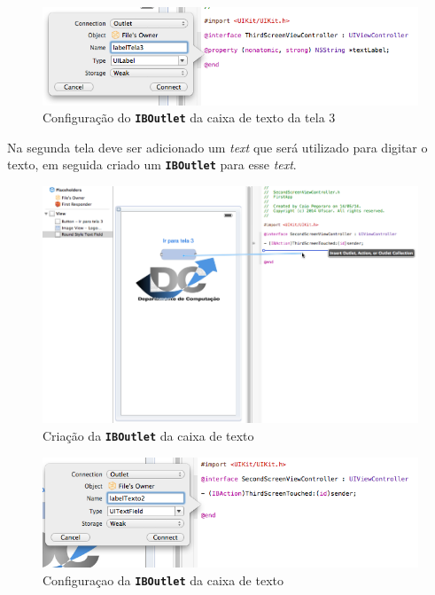 \documentclass[a4paper,12pt,brazil,oneside]{book}
\begin{document}
\begin{figure}[H]
  \centering
  \includegraphics[width=.75\textwidth]{figuras/3/tela_novo_projeto_46.png}
  \caption{Configuração do \texttt{\textbf{IBOutlet}} da caixa de texto da tela 3}
  \label{fig:a}
\end{figure} 
 

Na segunda tela deve ser adicionado um \emph{text} que será utilizado para digitar o texto, em seguida criado um \texttt{\textbf{IBOutlet}} para esse \emph{text}.

\begin{figure}[H]
  \centering
  \includegraphics[width=.99\textwidth]{figuras/3/tela_novo_projeto_42.png}
  \caption{Criação da \texttt{\textbf{IBOutlet}} da caixa de texto}
  \label{fig:a}
\end{figure} 

\begin{figure}[H]
  \centering
  \includegraphics[width=.75\textwidth]{figuras/3/tela_novo_projeto_43.png}
  \caption{Configuraçao da \texttt{\textbf{IBOutlet}} da caixa de texto}
  \label{fig:a}
\end{figure} 
\end{document}
